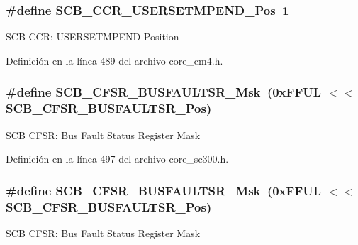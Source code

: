\subsubsection[{\texorpdfstring{S\+C\+B\+\_\+\+C\+C\+R\+\_\+\+U\+S\+E\+R\+S\+E\+T\+M\+P\+E\+N\+D\+\_\+\+Pos}{SCB_CCR_USERSETMPEND_Pos}}]{\setlength{\rightskip}{0pt plus 5cm}\#define S\+C\+B\+\_\+\+C\+C\+R\+\_\+\+U\+S\+E\+R\+S\+E\+T\+M\+P\+E\+N\+D\+\_\+\+Pos~1}\hypertarget{group___c_m_s_i_s___s_c_b_ga789e41f45f59a8cd455fd59fa7652e5e}{}\label{group___c_m_s_i_s___s_c_b_ga789e41f45f59a8cd455fd59fa7652e5e}
S\+CB C\+CR\+: U\+S\+E\+R\+S\+E\+T\+M\+P\+E\+ND Position 

Definición en la línea 489 del archivo core\+\_\+cm4.\+h.

\subsubsection[{\texorpdfstring{S\+C\+B\+\_\+\+C\+F\+S\+R\+\_\+\+B\+U\+S\+F\+A\+U\+L\+T\+S\+R\+\_\+\+Msk}{SCB_CFSR_BUSFAULTSR_Msk}}]{\setlength{\rightskip}{0pt plus 5cm}\#define S\+C\+B\+\_\+\+C\+F\+S\+R\+\_\+\+B\+U\+S\+F\+A\+U\+L\+T\+S\+R\+\_\+\+Msk~(0x\+F\+F\+U\+L $<$$<$ S\+C\+B\+\_\+\+C\+F\+S\+R\+\_\+\+B\+U\+S\+F\+A\+U\+L\+T\+S\+R\+\_\+\+Pos)}\hypertarget{group___c_m_s_i_s___s_c_b_ga26dc1ddfdc37a6b92597a6f7e498c1d6}{}\label{group___c_m_s_i_s___s_c_b_ga26dc1ddfdc37a6b92597a6f7e498c1d6}
S\+CB C\+F\+SR\+: Bus Fault Status Register Mask 

Definición en la línea 497 del archivo core\+\_\+sc300.\+h.

\subsubsection[{\texorpdfstring{S\+C\+B\+\_\+\+C\+F\+S\+R\+\_\+\+B\+U\+S\+F\+A\+U\+L\+T\+S\+R\+\_\+\+Msk}{SCB_CFSR_BUSFAULTSR_Msk}}]{\setlength{\rightskip}{0pt plus 5cm}\#define S\+C\+B\+\_\+\+C\+F\+S\+R\+\_\+\+B\+U\+S\+F\+A\+U\+L\+T\+S\+R\+\_\+\+Msk~(0x\+F\+F\+U\+L $<$$<$ S\+C\+B\+\_\+\+C\+F\+S\+R\+\_\+\+B\+U\+S\+F\+A\+U\+L\+T\+S\+R\+\_\+\+Pos)}\hypertarget{group___c_m_s_i_s___s_c_b_ga26dc1ddfdc37a6b92597a6f7e498c1d6}{}\label{group___c_m_s_i_s___s_c_b_ga26dc1ddfdc37a6b92597a6f7e498c1d6}
S\+CB C\+F\+SR\+: Bus Fault Status Register Mask 

